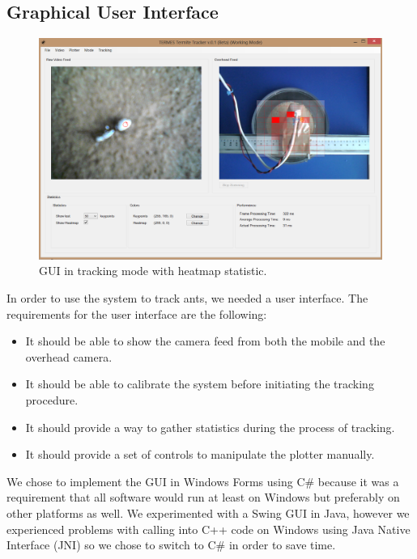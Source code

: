
\subsection{Graphical User Interface}
\begin{figure}[ht!]
  \centering
    \includegraphics[scale=0.35]{img/HeatmapGUI}
  \caption{GUI in tracking mode with heatmap statistic.}
  \label{fig:gui_heat}
\end{figure}

In order to use the system to track ants, we needed a user interface. The requirements for the user interface are the following:

\begin{itemize}
  \item{It should be able to show the camera feed from both the mobile and the overhead camera}.
  \item{It should be able to calibrate the system before initiating the tracking procedure}.
  \item{It should provide a way to gather statistics during the process of tracking}.
  \item{It should provide a set of controls to manipulate the plotter manually}.
\end{itemize}

We chose to implement the GUI in Windows Forms using C\# because it was a requirement that all software would run at least on Windows but preferably on other platforms as well. We experimented with a Swing GUI in Java, however we experienced problems with calling into C++ code on Windows using Java Native Interface (JNI) \cite{jni} so we chose to switch to C\# in order to save time. \\

